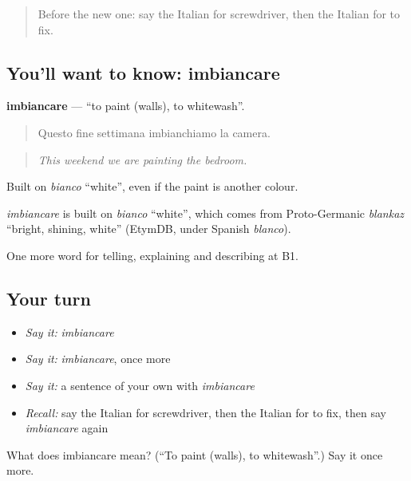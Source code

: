 \label{lesson:IT-C535-imbiancare}



\begin{quote}
Before the new one: say the Italian for screwdriver, then the Italian for to fix.
\end{quote}

\subsection*{You'll want to know: imbiancare}
\textbf{imbiancare} — \textquotedblleft{}to paint (walls), to whitewash\textquotedblright{}.

\begin{quote}
Questo fine settimana imbianchiamo la camera.
\end{quote}

\begin{quote}
\emph{This weekend we are painting the bedroom.}
\end{quote}

Built on \emph{bianco} \textquotedblleft{}white\textquotedblright{}, even if the paint is another colour.

\begin{cousinweb}
\emph{imbiancare} is built on \emph{bianco} \textquotedblleft{}white\textquotedblright{}, which comes from Proto-Germanic \emph{blankaz} \textquotedblleft{}bright, shining, white\textquotedblright{} (EtymDB, under Spanish \emph{blanco}).
\end{cousinweb}

\begin{grammarlens}[title={What you've built}]
One more word for telling, explaining and describing at B1.
\end{grammarlens}

\subsection*{Your turn}
\begin{itemize}
\raggedright
  \item \emph{Say it:} \emph{imbiancare}
  \item \emph{Say it:} \emph{imbiancare}, once more
  \item \emph{Say it:} a sentence of your own with \emph{imbiancare}
  \item \emph{Recall:} say the Italian for screwdriver, then the Italian for to fix, then say \emph{imbiancare} again
\end{itemize}

\begin{tcolorbox}[breakable,colback=teal!4,colframe=teal!35!black,title={Before you move on}]
What does imbiancare mean? (\textquotedblleft{}To paint (walls), to whitewash\textquotedblright{}.) Say it once more.
\end{tcolorbox}
